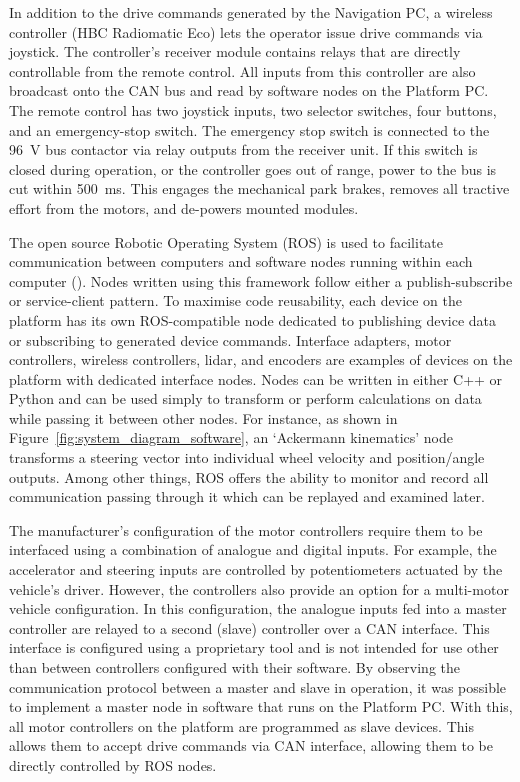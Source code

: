 \documentclass[preprint,authoryear,12pt]{elsarticle}
\begin{document}
        In addition to the drive commands generated by the Navigation PC, a wireless controller (HBC Radiomatic Eco) lets the operator issue drive commands via joystick.
        The controller's receiver module contains relays that are directly controllable from the remote control.
        All inputs from this controller are also broadcast onto the CAN bus and read by software nodes on the Platform PC.
        The remote control has two joystick inputs, two selector switches, four buttons, and an emergency-stop switch.
        The emergency stop switch is connected to the \SI{96}{\volt} bus contactor via relay outputs from the receiver unit.
        If this switch is closed during operation, or the controller goes out of range, power to the bus is cut within \SI{500}{\milli\second}.
        This engages the mechanical park brakes, removes all tractive effort from the motors, and de-powers mounted modules.

        The open source Robotic Operating System (ROS) is used to facilitate communication between computers and software nodes running within each computer (\cite{quigley2009}).
        Nodes written using this framework follow either a publish-subscribe or service-client pattern.
        To maximise code reusability, each device on the platform has its own ROS-compatible node dedicated to publishing device data or subscribing to generated device commands.
        Interface adapters, motor controllers, wireless controllers, lidar, and encoders are examples of devices on the platform with dedicated interface nodes.
        Nodes can be written in either C++ or Python and can be used simply to transform or perform calculations on data while passing it between other nodes.
        For instance, as shown in Figure~\ref{fig:system_diagram_software}, an `Ackermann kinematics' node transforms a steering vector into individual wheel velocity and position/angle outputs.
        Among other things, ROS offers the ability to monitor and record all communication passing through it which can be replayed and examined later.

        The manufacturer's configuration of the motor controllers require them to be interfaced using a combination of analogue and digital inputs.
        For example, the accelerator and steering inputs are controlled by potentiometers actuated by the vehicle's driver.
        However, the controllers also provide an option for a multi-motor vehicle configuration.
        In this configuration, the analogue inputs fed into a master controller are relayed to a second (slave) controller over a CAN interface.
        This interface is configured using a proprietary tool and is not intended for use other than between controllers configured with their software.
        By observing the communication protocol between a master and slave in operation, it was possible to implement a master node in software that runs on the Platform PC.
        With this, all motor controllers on the platform are programmed as slave devices.
        This allows them to accept drive commands via CAN interface, allowing them to be directly controlled by ROS nodes.
\end{document}
